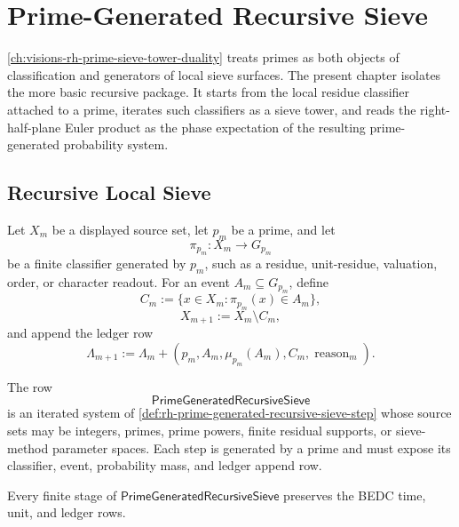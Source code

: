 \chapter{Prime-Generated Recursive Sieve}
\label{ch:visions-rh-prime-generated-recursive-sieve}

\autoref{ch:visions-rh-prime-sieve-tower-duality} treats primes as both
objects of classification and generators of local sieve surfaces.  The
present chapter isolates the more basic recursive package.  It starts
from the local residue classifier attached to a prime, iterates such
classifiers as a sieve tower, and reads the right-half-plane Euler
product as the phase expectation of the resulting prime-generated
probability system.

\section{Recursive Local Sieve}
\label{sec:rh-prime-generated-recursive-local-sieve}

\begin{definition}
\label{def:rh-prime-generated-recursive-sieve-step}
Let $X_m$ be a displayed source set, let $p_m$ be a prime, and let
$$
\pi_{p_m}:X_m\to G_{p_m}
$$
be a finite classifier generated by $p_m$, such as a residue,
unit-residue, valuation, order, or character readout.  For an event
$A_m\subseteq G_{p_m}$, define
$$
C_m:=\{x\in X_m:\pi_{p_m}(x)\in A_m\},
$$
$$
X_{m+1}:=X_m\setminus C_m,
$$
and append the ledger row
$$
\Lambda_{m+1}
:=
\Lambda_m+
(p_m,A_m,\mu_{p_m}(A_m),C_m,\operatorname{reason}_m).
$$
\end{definition}

\begin{definition}[PrimeGeneratedRecursiveSieve]
\label{def:rh-prime-generated-recursive-sieve}
The row
$$
\mathsf{PrimeGeneratedRecursiveSieve}
$$
is an iterated system of
\autoref{def:rh-prime-generated-recursive-sieve-step} whose source
sets may be integers, primes, prime powers, finite residual supports,
or sieve-method parameter spaces.  Each step is generated by a prime
and must expose its classifier, event, probability mass, and ledger
append row.
\end{definition}

\begin{theorem}
\label{thm:rh-recursive-prime-generated-sieve-preserves-bedc-rows}
Every finite stage of $\mathsf{PrimeGeneratedRecursiveSieve}$ preserves
the BEDC time, unit, and ledger rows.
\end{theorem}

